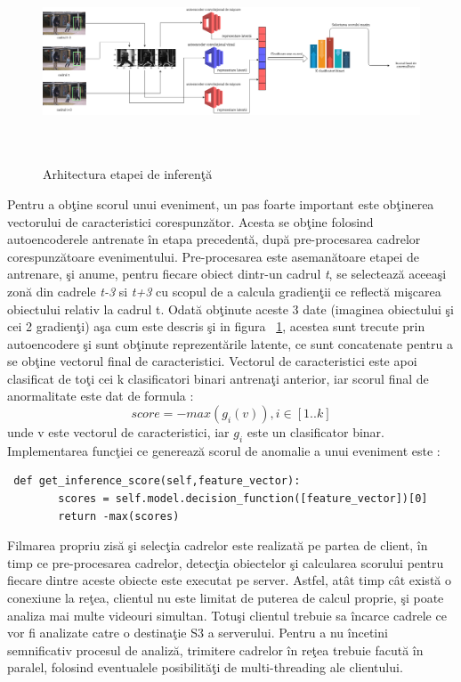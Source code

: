\documentclass[a4paper,12pt]{report}
\begin{document}
\begin{figure}[h]
\begin{center}
        \includegraphics[width=1\textwidth,height=6cm]{images/inference_architecture}
			 \caption{Arhitectura etapei de inferenţă}
			 \label{fig:inference_architecture}
\end{center}
\end{figure}
Pentru a obţine scorul unui eveniment, un pas foarte important este obţinerea vectorului de caracteristici corespunzător. Acesta se obţine folosind autoencoderele antrenate în etapa precedentă, după pre-procesarea cadrelor corespunzătoare evenimentului.  Pre-procesarea este asemanătoare etapei de antrenare, şi anume, pentru fiecare obiect dintr-un cadrul \emph{t}, se selectează aceeaşi zonă din cadrele \emph{t-3} si \emph{t+3} cu scopul de a calcula gradienţii ce reflectă mişcarea obiectului relativ la cadrul t. Odată obţinute aceste 3 date (imaginea obiectului şi cei 2 gradienţi) aşa cum este descris şi in figura
~\ref{fig:inference_architecture}, acestea sunt trecute prin autoencodere şi sunt obţinute reprezentările latente, ce sunt concatenate pentru a se obţine vectorul final de caracteristici. Vectorul de caracteristici este apoi clasificat de toţi cei k clasificatori binari antrenaţi anterior, iar scorul final de anormalitate este dat de formula : \[score = -max(g_{i}(v)), i \in [1..k]\] unde v este vectorul de caracteristici, iar \(g_{i}\) este un clasificator binar.
Implementarea funcţiei ce generează scorul de anomalie a unui eveniment este : 
\begin{lstlisting}
 def get_inference_score(self,feature_vector):
        scores = self.model.decision_function([feature_vector])[0]
        return -max(scores)
\end{lstlisting}
\par
Filmarea propriu zisă şi selecţia cadrelor este realizată pe partea de client, în timp ce pre-procesarea cadrelor, detecţia obiectelor şi calcularea scorului pentru fiecare dintre aceste obiecte este executat pe server. Astfel, atât timp cât există o conexiune la reţea, clientul nu este limitat de puterea de calcul proprie, şi poate analiza mai multe videouri simultan. Totuşi clientul trebuie sa încarce cadrele ce vor fi analizate catre o destinaţie S3 a serverului. Pentru a nu încetini semnificativ procesul de analiză, trimitere cadrelor în reţea trebuie facută în paralel, folosind eventualele posibilităţi de multi-threading ale clientului.
\end{document}
